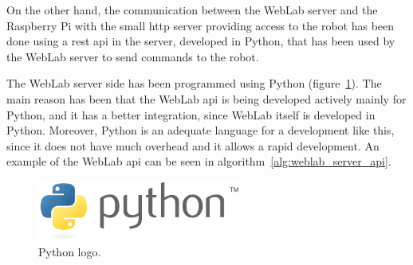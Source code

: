 On the other hand, the communication between the WebLab server and the Raspberry Pi with the small
\acrshort{http} server providing access to the robot has been done using a \acrshort{rest}
\acrshort{api} in the server, developed in Python, that has been used by the WebLab server to send
commands to the robot.

The WebLab server side has been programmed using Python (figure~\ref{fig:python}). The main reason
has been that the WebLab \acrshort{api} is being developed actively mainly for Python, and it has
a better integration, since WebLab itself is developed in Python. Moreover, Python is an adequate
language for a development like this, since it does not have much overhead and it allows a rapid
development. An example of the WebLab \acrshort{api} can be seen in
algorithm~\ref{alg:weblab_server_api}.

\begin{figure}[!htbp]
	\centering
	\includegraphics[width=0.6\textwidth]{fig/python}
	\caption{Python logo.}
	\label{fig:python}
\end{figure}

